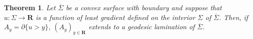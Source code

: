 \documentclass[reqno,12pt,letterpaper]{amsart}
\newcommand{\RR}{\mathbf{R}}
\newtheorem{theorem}{Theorem}[section]
\newtheorem{corollary}[theorem]{Corollary}
\theoremstyle{definition}
\newtheorem{example}[theorem]{Example}
\numberwithin{equation}{section}
\begin{document}
\begin{theorem}\label{main crly}
Let $\overline \Sigma$ be a convex surface with boundary and suppose that $u: \Sigma \to \RR$ is a function of least gradient defined on the interior $\Sigma$ of $\overline \Sigma$.
Then, if $A_y = \partial \{u > y\}$, $(A_y)_{y \in \RR}$ extends to a geodesic lamination of $\overline \Sigma$.
\end{theorem}
%
%
%
%
%
\end{document}

